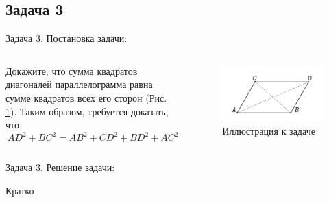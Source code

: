 \documentclass{beamer}
\begin{document}
\begin{frame}
   \subsection{Задача 3}
   \begin{block}{Задача 3. Постановка задачи:}
      \begin{columns}
         \begin{column}{0.5\textwidth}
            Докажите, что сумма квадратов диагоналей параллелограмма
            равна сумме квадратов всех его сторон (Рис. \ref{t3:im}).
            Таким образом, требуется доказать, что
            \begin{equation}
               AD^2 + BC^2 = AB^2 +CD^2 + BD^2 + AC^2
               \label{t3:f1}
            \end{equation}

         \end{column}
         \begin{column}{0.5\textwidth}
            \begin{figure}[h]
               \centering
               \includegraphics[width=1\textwidth]{images/task3.pdf}
               \caption{Иллюстрация к задаче}
               \label{t3:im}
            \end{figure}
         \end{column}
      \end{columns}
   \end{block}
\end{frame}

\begin{frame}
   \begin{block}{Задача 3. Решение задачи:}

      Кратко
   \end{block}
\end{frame}
\end{document}
